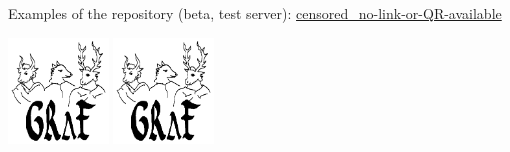 \documentclass[14pt, a2paper, portrait,innermargin=5mm,
blockverticalspace=5mm, colspace=5mm, subcolspace=3mm]{tikzposter}
\begin{document}
{\begin{minipage}[t]{0.28\textwidth}
{

\bigskip


Examples of the repository (beta, test server): \small\protect\url{censored_no-link-or-QR-available} \normalsize
\begin{tikzfigure}
            \includegraphics[width=0.2\textwidth]{graf-logo-schwarz.png}\hspace{1em}
            \includegraphics[width=0.2\textwidth]{graf-logo-schwarz.png}
        \end{tikzfigure}
}



\end{minipage}}
\end{document}
